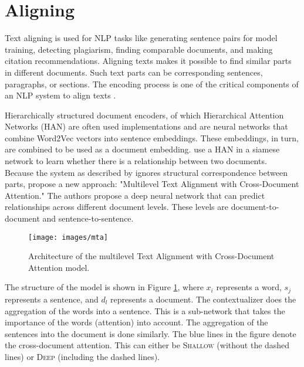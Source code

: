 \section{Aligning}
\label{sectAligning}

Text aligning is used for NLP tasks like generating sentence pairs for model training, detecting plagiarism, finding comparable documents, and making citation recommendations. Aligning texts makes it possible to find similar parts in different documents. Such text parts can be corresponding sentences, paragraphs, or sections. The encoding process is one of the critical components of an NLP system to align texts \citep{zhou2020multilevel}. 

Hierarchically structured document encoders, of which Hierarchical Attention Networks (HAN) \citep{yang2016hierarchical} are often used implementations and are neural networks that combine Word2Vec \citep{mikolov2013distributed} vectors into sentence embeddings. These embeddings, in turn, are combined to be used as a document embedding. \citet{jiang2019semantic} use a HAN in a siamese network \citep{mueller2016siamese} to learn whether there is a relationship between two documents.\\


Because the system as described by \citet{jiang2019semantic} ignores structural correspondence between parts, \citet{zhou2020multilevel} propose a new approach: "Multilevel Text Alignment with Cross-Document Attention." The authors propose a deep neural network that can predict relationships across different document levels. These levels are document-to-document and sentence-to-sentence.

\begin{figure}[h]
\centering
\captionsetup{justification=centering}
\texttt{[image: images/mta]}\caption{Architecture of the multilevel Text Alignment with Cross-Document Attention model.}
\label{imgmta}
\end{figure}

The structure of the model is shown in Figure \ref{imgmta}, where $x_i$ represents a word, $s_j$ represents a sentence, and $d_l$ represents a document. The contextualizer does the aggregation of the words into a sentence. This is a sub-network that takes the importance of the words (attention) into account. The aggregation of the sentences into the document is done similarly. The blue lines in the figure denote the cross-document attention. This can either be \textsc{Shallow} (without the dashed lines) or \textsc{Deep} (including the dashed lines).

